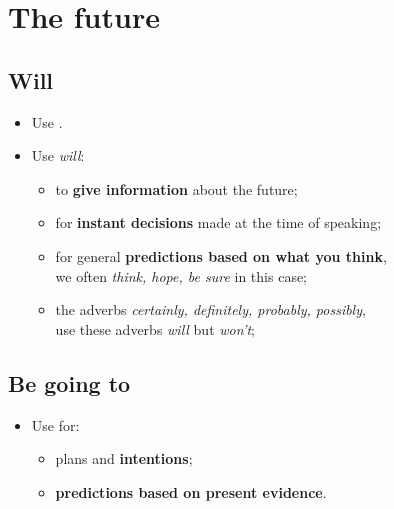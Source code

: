 \section{The future}

\subsection{Will}
\begin{itemize}
    \item Use .
    \item Use \textit{will}:
    \begin{itemize}
        \item to \textbf{give information} about the future;
        \item for \textbf{instant decisions} made at the time of speaking;
        \item for general \textbf{predictions based on what you think},\\
        we often  \textit{think, hope, be sure} in this case;
        \item[\aast]  the adverbs \textit{certainly, definitely, probably, possibly},\\
        use these adverbs  \textit{will} but  \textit{won't};
    \end{itemize}
\end{itemize}

\subsection{Be going to}
\begin{itemize}
    \item Use  for:
    \begin{itemize}
        \item plans and \textbf{intentions};
        \item \textbf{predictions based on present evidence}.
    \end{itemize}
\end{itemize}

